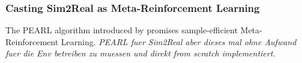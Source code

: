 \documentclass[a4paper]{article}
\begin{document}
\subsubsection{Casting Sim2Real as Meta-Reinforcement Learning}
The PEARL algorithm introduced by \cite{rakelly2019} promises sample-efficient Meta-Reinforcement Learning.
\textit{PEARL fuer Sim2Real aber dieses mal ohne Aufwand fuer die Env betreiben zu muessen und direkt from scratch implementiert.}



\end{document}
